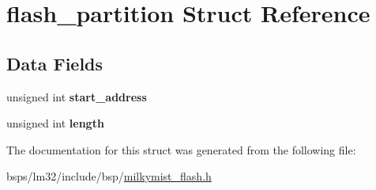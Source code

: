 \hypertarget{structflash__partition}{}\section{flash\+\_\+partition Struct Reference}
\label{structflash__partition}
\subsection*{Data Fields}
\begin{DoxyCompactItemize}
\item 
unsigned int {\bfseries start\+\_\+address}
\item 
unsigned int {\bfseries length}
\end{DoxyCompactItemize}


The documentation for this struct was generated from the following file\+:\begin{DoxyCompactItemize}
\item 
bsps/lm32/include/bsp/\mbox{\hyperlink{milkymist__flash_8h}{milkymist\+\_\+flash.\+h}}\end{DoxyCompactItemize}
